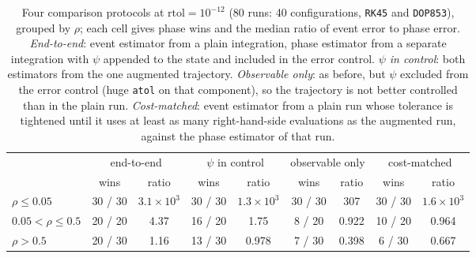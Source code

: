 \begin{table}[!htbp]
\centering
\caption{Four comparison protocols at $\mathrm{rtol}=10^{-12}$ (80 runs: 40 configurations, \texttt{RK45} and \texttt{DOP853}), grouped by $\rho$; each cell gives phase wins and the median ratio of event error to phase error. \emph{End-to-end}: event estimator from a plain integration, phase estimator from a separate integration with $\psi$ appended to the state and included in the error control. \emph{$\psi$ in control}: both estimators from the one augmented trajectory. \emph{Observable only}: as before, but $\psi$ excluded from the error control (huge \texttt{atol} on that component), so the trajectory is not better controlled than in the plain run. \emph{Cost-matched}: event estimator from a plain run whose tolerance is tightened until it uses at least as many right-hand-side evaluations as the augmented run, against the phase estimator of that run.}
\label{tab:protocol}
\small
\begin{tabular}{lcccccccc}
\toprule
 & \multicolumn{2}{c}{end-to-end} & \multicolumn{2}{c}{$\psi$ in control} & \multicolumn{2}{c}{observable only} & \multicolumn{2}{c}{cost-matched} \\
 & wins & ratio & wins & ratio & wins & ratio & wins & ratio \\
\midrule
$\rho\le0.05$ & 30 / 30 & $3.1\times10^{3}$ & 30 / 30 & $1.3\times10^{3}$ & 30 / 30 & 307 & 30 / 30 & $1.6\times10^{3}$ \\
$0.05<\rho\le0.5$ & 20 / 20 & 4.37 & 16 / 20 & 1.75 & 8 / 20 & 0.922 & 10 / 20 & 0.964 \\
$\rho>0.5$ & 20 / 30 & 1.16 & 13 / 30 & 0.978 & 7 / 30 & 0.398 & 6 / 30 & 0.667 \\
\bottomrule
\end{tabular}
\end{table}
